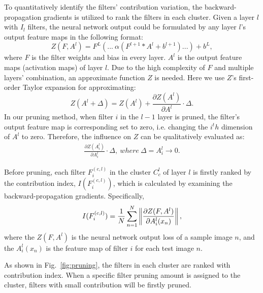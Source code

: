 \documentclass{article} %
\begin{document}
To quantitatively identify the filters' contribution variation, the backward-propagation gradients is utilized to rank the filters in each cluster.
	Given a layer $l$ with $I_{l}$ filters, the neural network output could be formulated by any layer $l$'s output feature maps in the following format:
	\begin{equation}
		Z(F, A^{l}) = F^L (... ~\alpha(F^{l+1} * A^{l}+b^{l+1}) ...) + b^L,
		\label{eq:1}
	\end{equation}
	where $F$ is the filter weights and bias in every layer.
	$A^{l}$ is the output feature maps (activation maps) of layer $l$.
	Due to the high complexity of $F$ and multiple layers' combination, an approximate function $Z$ is needed.
	Here we use $Z$'s first-order Taylor expansion for approximating:
	\begin{equation}
		Z(A^l+\Delta) = Z(A^l) + \frac{\partial Z(A^l)}{\partial A^l} \cdot \Delta.
		\label{eq:1}
	\end{equation}
	In our pruning method, when filter $i$ in the $l-1$ layer is pruned, the filter's output feature map is corresponding set to zero, i.e. changing the $i^th$ dimension of $A^l$ to zero.
	Therefore, the influence on $Z$ can be qualitatively evaluated as:
	\begin{equation}
		\begin{aligned}
			\frac{\partial Z(A_i^l)}{\partial A_i^l} \cdot \Delta, ~ where ~ \Delta = A_i^l \rightarrow 0.
			\label{eq:1}
		\end{aligned}
	\end{equation}

	Before pruning, each filter $F^{(c,l)}_i$ in the cluster $C_c^l$ of layer $l$ is firstly ranked by the contribution index, $I(F^{(c,l)}_i)$, which is calculated by examining the backward-propagation gradients.
	Specifically,
	\begin{equation}
		\medmuskip=-2mu
		I(F^{(c,l)}_i) = \frac{1}{N}\sum_{n=1}^{N} \left \| \frac{\partial Z(F, A^{l})}{\partial A_{i}^{l}(x_{n})} \right \|,
		\label{eq:contri}
		\vspace{-0.5mm}
	\end{equation}
	where the $Z(F, A^{l})$ is the neural network output loss of a sample image $n$, and the $A_i^l(x_{n})$ is the feature map of filter $i$ for each test image $n$.

	As shown in Fig.~\ref{fig:pruning}, the filters in each cluster are ranked with contribution index.
	When a specific filter pruning amount is assigned to the cluster, filters with small contribution will be firstly pruned.
\end{document}
